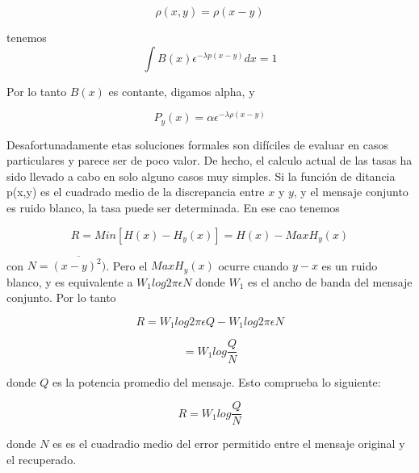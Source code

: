 \begin{equation} \rho(x,y) = \rho(x - y) \end{equation}
		
tenemos
\begin{equation} \int B(x) \epsilon^{-\lambda p(x-y)} dx = 1 \end{equation}
			
Por lo tanto $B(x)$ es contante, digamos alpha, y

\begin{equation} P_{y}(x) = \alpha \epsilon^{ -\lambda \rho(x - y)} \end{equation}
			
Desafortunadamente etas soluciones formales son dif\'iciles de evaluar en casos particulares
y parece ser de poco valor. De hecho, el calculo actual de las tasas ha sido llevado a cabo
en solo alguno casos muy simples.
Si la funci\'on de ditancia p(x,y) es el cuadrado medio de la discrepancia entre $x$ y $y$, y el
mensaje conjunto es ruido blanco, la tasa puede ser determinada. En ese cao tenemos

\begin{equation} R = Min[ H(x) - H_{y}(x)] = H(x) - MaxH_{y}(x) \end{equation}
		
con $N = \overline{(x-y)^{2})}$. Pero el $MaxH_{y}(x)$ ocurre cuando $y - x$ es un ruido blanco, y es
equivalente a $W_{1} log 2 \pi \epsilon N$ donde $W_{1}$ es el ancho de banda del mensaje conjunto.
Por lo tanto

\begin{equation} R = W_{1} log 2 \pi \epsilon Q - W_{1} log 2 \pi \epsilon N \end{equation}
		
\begin{equation} = W_{1} log \frac{Q}{N} \end{equation}
		  
donde $Q$ es la potencia promedio del mensaje. Esto comprueba lo siguiente:

\newtheorem{Teorema 22}{Teorema 22: La tasa para la medici\'on de fidelidad de una fuente de ruido blanco de
potencia $Q$ y banda $W_{1}$ relativa a un R.M.S. es:}

\begin{equation} R = W_{1} log \frac{Q}{N} \end{equation}
		
donde $N$ es es el cuadradio medio del error permitido entre el mensaje original y el
recuperado.

